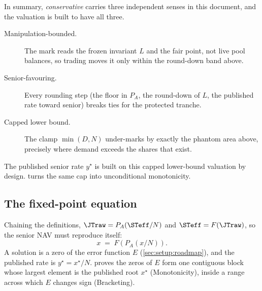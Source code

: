 In summary, \emph{conservative} carries three independent senses in
this document, and the valuation is built to have all three.
\begin{description}
  \item[Manipulation-bounded.] The mark reads the frozen invariant $L$
    and the fair point, not live pool balances, so trading moves it only
    within the round-down band above.
  \item[Senior-favouring.] Every rounding step (the floor in $P_A$,
    the round-down of $L$, the published rate toward senior) breaks
    ties for the protected tranche.
  \item[Capped lower bound.] The clamp $\min(D, N)$ under-marks by
    exactly the phantom area above, precisely where demand exceeds the
    shares that exist.
\end{description}
The published senior rate $y^\star$ is built on this capped
lower-bound valuation by design.  turns the same
cap into unconditional monotonicity.

\subsection{The fixed-point equation}
\label{sec:setup:circularity}

Chaining the definitions, $\JTraw = P_A(\STeff/N)$ and
$\STeff = F(\JTraw)$, so the senior NAV must reproduce itself:
\begin{equation}
  x \;=\; F\!\left(P_A\!\left(x / N\right)\right).
  \label{eq:fixed-point}
\end{equation}
A solution is a zero of the error function $E$
(\cref{sec:setup:roadmap}), and the published rate is
$y^\star = x^\star / N$.  proves the zeros of $E$ form one
contiguous block whose largest element is the published root $x^\star$
(Monotonicity), inside a range across which $E$ changes sign
(Bracketing).
